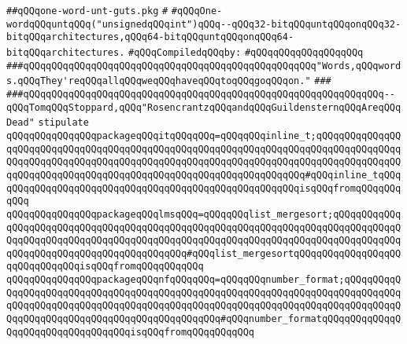 \label{src/lib/std/src/one-word-unt-guts.pkg}
\verb|##qQQqone-word-unt-guts.pkg|\newline
\verb|#|\newline
\verb|#qQQqOne-wordqQQquntqQQq("unsignedqQQqint")qQQq--qQQq32-bitqQQquntqQQqonqQQq32-bitqQQqarchitectures,qQQq64-bitqQQquntqQQqonqQQq64-bitqQQqarchitectures.|\newline
\newline
\verb|#qQQqCompiledqQQqby:|\newline
\verb|#qQQqqQQqqQQqqQQqqQQq|\newline
\newline
\verb|###qQQqqQQqqQQqqQQqqQQqqQQqqQQqqQQqqQQqqQQqqQQqqQQqqQQq"Words,qQQqwords.qQQqThey'reqQQqallqQQqweqQQqhaveqQQqtoqQQqgoqQQqon."|\newline
\verb|###|\newline
\verb|###qQQqqQQqqQQqqQQqqQQqqQQqqQQqqQQqqQQqqQQqqQQqqQQqqQQqqQQqqQQqqQQq--qQQqTomqQQqStoppard,qQQq"RosencrantzqQQqandqQQqGuildensternqQQqAreqQQqDead"|\newline
\newline
\newline
\newline
\verb|stipulate|\newline
\verb|qQQqqQQqqQQqqQQqpackageqQQqitqQQqqQQq=qQQqqQQqinline_t;qQQqqQQqqQQqqQQqqQQqqQQqqQQqqQQqqQQqqQQqqQQqqQQqqQQqqQQqqQQqqQQqqQQqqQQqqQQqqQQqqQQqqQQqqQQqqQQqqQQqqQQqqQQqqQQqqQQqqQQqqQQqqQQqqQQqqQQqqQQqqQQqqQQqqQQqqQQqqQQqqQQqqQQqqQQqqQQqqQQqqQQqqQQqqQQqqQQqqQQqqQQqqQQq#qQQqinline_tqQQqqQQqqQQqqQQqqQQqqQQqqQQqqQQqqQQqqQQqqQQqqQQqqQQqqQQqisqQQqfromqQQqqQQqqQQq|\newline
\verb|qQQqqQQqqQQqqQQqpackageqQQqlmsqQQq=qQQqqQQqlist_mergesort;qQQqqQQqqQQqqQQqqQQqqQQqqQQqqQQqqQQqqQQqqQQqqQQqqQQqqQQqqQQqqQQqqQQqqQQqqQQqqQQqqQQqqQQqqQQqqQQqqQQqqQQqqQQqqQQqqQQqqQQqqQQqqQQqqQQqqQQqqQQqqQQqqQQqqQQqqQQqqQQqqQQqqQQqqQQqqQQqqQQqqQQq#qQQqlist_mergesortqQQqqQQqqQQqqQQqqQQqqQQqqQQqqQQqisqQQqfromqQQqqQQqqQQq|\newline
\verb|qQQqqQQqqQQqqQQqpackageqQQqnfqQQqqQQq=qQQqqQQqnumber_format;qQQqqQQqqQQqqQQqqQQqqQQqqQQqqQQqqQQqqQQqqQQqqQQqqQQqqQQqqQQqqQQqqQQqqQQqqQQqqQQqqQQqqQQqqQQqqQQqqQQqqQQqqQQqqQQqqQQqqQQqqQQqqQQqqQQqqQQqqQQqqQQqqQQqqQQqqQQqqQQqqQQqqQQqqQQqqQQqqQQqqQQqqQQq#qQQqnumber_formatqQQqqQQqqQQqqQQqqQQqqQQqqQQqqQQqqQQqisqQQqfromqQQqqQQqqQQq|\newline
